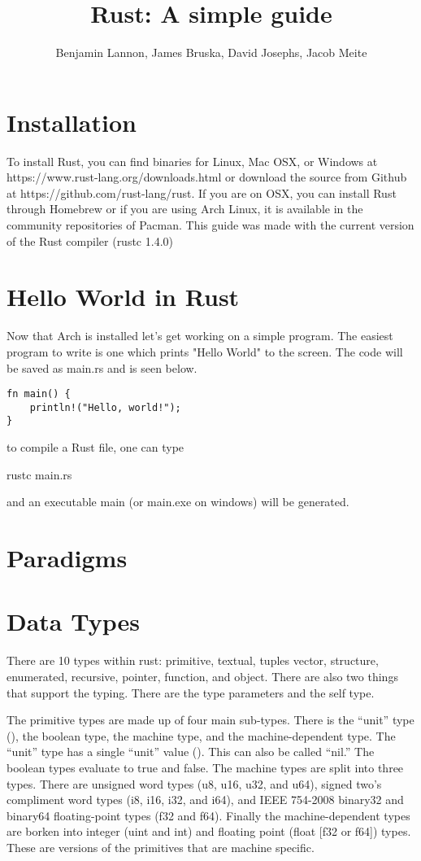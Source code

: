\documentclass{article}
\title{Rust: A simple guide}
\author{Benjamin Lannon, James Bruska, David Josephs, Jacob Meite}
\begin{document}
\maketitle
\tableofcontents

\section{Installation}
To install Rust, you can find binaries for Linux, Mac OSX, or Windows at https://www.rust-lang.org/downloads.html or download the source from Github at https://github.com/rust-lang/rust. If you are on OSX, you can install Rust through Homebrew or if you are using Arch Linux, it is available in the community repositories of Pacman. This guide was made with the current version of the Rust compiler (rustc 1.4.0)

\section{Hello World in Rust}
Now that Arch is installed let's get working on a simple program. The easiest program to write is one which prints "Hello World" to the screen. The code will be saved as main.rs and is seen below.
\begin{lstlisting}
fn main() {
	println!("Hello, world!");
}
\end{lstlisting}

to compile a Rust file, one can type \begin{small}
rustc main.rs
\end{small}
and an executable main (or main.exe on windows) will be generated.

\section{Paradigms}

\section{Data Types}
There are 10 types within rust: primitive, textual, tuples vector, structure, enumerated, recursive, pointer, function, and object. There are also two things that support the typing. There are the type parameters and the self type.

The primitive types are made up of four main sub-types. There is the “unit” type (), the boolean type, the machine type, and the machine-dependent type. The “unit” type has a single “unit” value (). This can also be called “nil.” The boolean types evaluate to true and false. The machine types are split into three types. There are unsigned word types (u8, u16, u32, and u64), signed two's compliment word types (i8, i16, i32, and i64), and IEEE 754-2008 binary32 and binary64 floating-point types (f32 and f64). Finally the machine-dependent types are borken into integer (uint and int) and floating point (float [f32 or f64]) types. These are versions of the primitives that are machine specific. 
\end{document}
